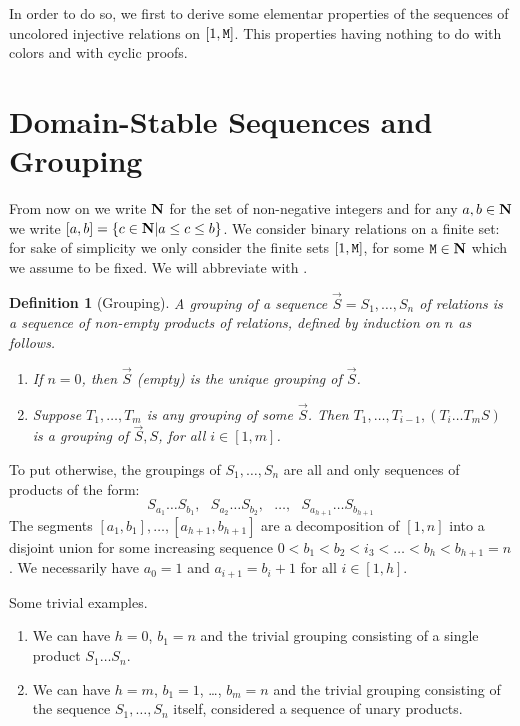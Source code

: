 \documentclass{lmcs}
\newtheorem{definition}[theorem]{Definition}
\begin{document}
In order to do so, we first to derive some elementar properties of the sequences of uncolored injective relations on $[1,{\tt M}]$. This properties having nothing to do with colors and
with cyclic proofs.


\newpage   \section{Domain-Stable Sequences and Grouping}
From now on we write ${\bf N}$ for the set of non-negative integers and for any $a,b \in {\bf N}$
we write $[a,b] = \{c \in {\bf N} | a \le c \le b\}$. 
We consider binary relations on a finite set: for sake of simplicity we only 
consider the finite sets $[1,{\tt M}]$, for some ${\tt M} \in {\bf N}$ which we assume to be
fixed. We will abbreviate  with
. 

\begin{definition}[Grouping]
A grouping of a sequence $\vec{S} = S_1, \ldots, S_n$ of relations is a sequence
of non-empty products of relations, defined by induction on $n$ as follows.
\begin{enumerate}
\item
If $n=0$, then $\vec{S}$ (empty) is the unique grouping of $\vec{S}$.
\item
Suppose $T_1, \ldots, T_m$ is any grouping of some $\vec{S}$. 
Then $T_1, \ldots, T_{i-1}, (T_i \ldots T_m S)$ is a grouping of 
$\vec{S},S$, for all $i \in [1,m]$. 
\end{enumerate}
\end{definition}

To put otherwise, the groupings of $S_1, \ldots, S_n$ are all and only 
sequences of products of the form: 
$$
S_{a_1} \ldots S_{b_1}, \ \ \ 
S_{a_2} \ldots S_{b_2}, \ \ \ 
\ldots, \ \ \ 
S_{a_{h+1}} \ldots S_{b_{h+1}}
$$
The segments $[a_1,b_1], \ldots, [a_{h+1},b_{h+1}]$ are a decomposition
of $[1,n]$ into a disjoint union for some increasing sequence 
$0 < b_1 < b_2 < i_3 < \ldots < b_h < b_{h+1} = n$. We necessarily have
$a_0=1$ and $a_{i+1} = b_i+1$ for all $i \in [1,h]$. 

Some trivial examples. 
\begin{enumerate}
\item
We can have $h=0$, $b_1=n$ and the trivial grouping consisting of a single product  
$S_1 \ldots S_n$. 
\item
We can have $h=m$, $b_1=1$, \ldots, $b_m=n$ and the trivial grouping consisting of the 
sequence $S_1, \ldots, S_n$ itself, considered a sequence of unary products.
\end{enumerate}
\end{document}
